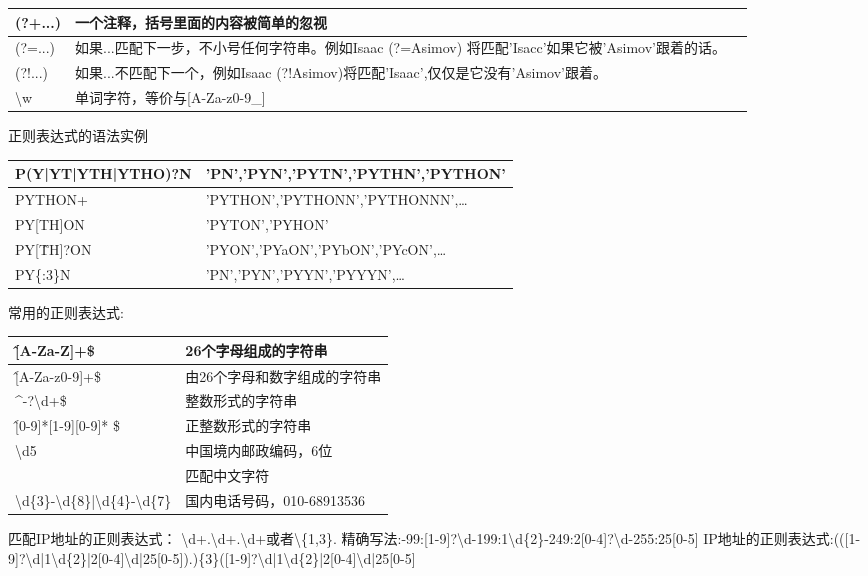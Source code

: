 \begin{center}
\begin{tabular}{|p{3cm}|p{10cm}|p{4cm}|}
\hline
(?+...)&一个注释，括号里面的内容被简单的忽视&\\
\hline
(?=...)&如果...匹配下一步，不小号任何字符串。例如Isaac (?=Asimov) 将匹配'Isacc'如果它被'Asimov'跟着的话。&\\
\hline
(?!...)&如果...不匹配下一个，例如Isaac (?!Asimov)将匹配'Isaac',仅仅是它没有'Asimov'跟着。&\\
\hline
\textbackslash w&单词字符，等价与[A-Za-z0-9\_]&\\
\hline
\end{tabular}
\end{center}
正则表达式的语法实例
\begin{center}
\begin{tabular}{|p{6cm}|p{8cm}|}
\hline
P(Y|YT|YTH|YTHO)?N&'PN','PYN','PYTN','PYTHN','PYTHON'\\
\hline
PYTHON+&'PYTHON','PYTHONN','PYTHONNN',\ldots\\
\hline
PY[TH]ON&'PYTON','PYHON'\\
\hline
PY[\^TH]?ON&'PYON','PYaON','PYbON','PYcON',\ldots\\
\hline
PY\{:3\}N&'PN','PYN','PYYN','PYYYN',\ldots\\
\hline
\end{tabular}
\end{center}
常用的正则表达式:
\begin{center}
\begin{tabular}{||l|l||}
\hline
\^[A-Za-Z]+\$ &26个字母组成的字符串\\
\hline
\^[A-Za-z0-9]+\$&由26个字母和数字组成的字符串\\
\hline
\^\quad-?\textbackslash d+\$&整数形式的字符串\\
\hline
\^[0-9]*[1-9][0-9]* \$&正整数形式的字符串\\
\hline
[1-9]\textbackslash d{5}&中国境内邮政编码，6位\\
\hline
[\textbackslash u4e00-\textbackslash u9fa5]&匹配中文字符\\
\hline
\textbackslash d\{3\}-\textbackslash d\{8\}|\textbackslash d\{4\}-\textbackslash d\{7\}&国内电话号码，010-68913536\\
\hline

\end{tabular}
\end{center}
匹配IP地址的正则表达式：
\textbackslash d+.\textbackslash d+.\textbackslash d+或者\textbackslash\{1,3\}.
精确写法:-99:[1-9]?\textbackslash d-199:1\textbackslash d\{2\}-249:2[0-4]?\textbackslash d-255:25[0-5]\newline
IP地址的正则表达式:(([1-9]?\textbackslash d|1\textbackslash d\{2\}|2[0-4]\textbackslash d|25[0-5]).)\{3\}([1-9]?\textbackslash d|1\textbackslash d\{2\}|2[0-4]\textbackslash d|25[0-5]
